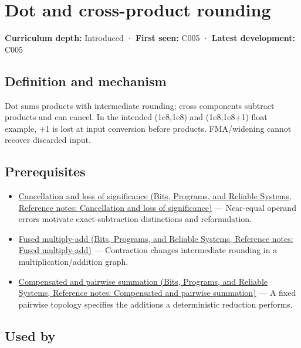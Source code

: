 \hypertarget{appendix-5aef4f13483a}{}\label{referencestart:appendix-5aef4f13483a}
\section{Dot and cross-product rounding}\label{appendix-5aef4f13483a-dot-and-cross-product-rounding}

\textbf{Curriculum depth:} Introduced · \textbf{First seen:} C005 · \textbf{Latest development:} C005

\subsection{Definition and mechanism}\label{appendix-5aef4f13483a-definition-and-mechanism}

Dot sums products with intermediate rounding; cross components subtract products and can cancel. In the intended (1e8,1e8) and (1e8,1e8+1) float example, +1 is lost at input conversion before products. FMA/widening cannot recover discarded input.

\subsection{Prerequisites}\label{appendix-5aef4f13483a-prerequisites}

\begin{itemize}
\tightlist
\item
  \href{../01-Bits-Programs-and-Reliable-Systems/main.pdf\#nameddest=appendix-a2773a6a2f9d}{Cancellation and loss of significance (Bits, Programs, and Reliable Systems, Reference notes: Cancellation and loss of significance)} --- Near-equal operand errors motivate exact-subtraction distinctions and reformulation.
\item
  \href{../01-Bits-Programs-and-Reliable-Systems/main.pdf\#nameddest=appendix-41e8ef22a21e}{Fused multiply-add (Bits, Programs, and Reliable Systems, Reference notes: Fused multiply-add)} --- Contraction changes intermediate rounding in a multiplication/addition graph.
\item
  \href{../01-Bits-Programs-and-Reliable-Systems/main.pdf\#nameddest=appendix-df318da57389}{Compensated and pairwise summation (Bits, Programs, and Reliable Systems, Reference notes: Compensated and pairwise summation)} --- A fixed pairwise topology specifies the additions a deterministic reduction performs.
\end{itemize}

\subsection{Used by}\label{appendix-5aef4f13483a-used-by}

